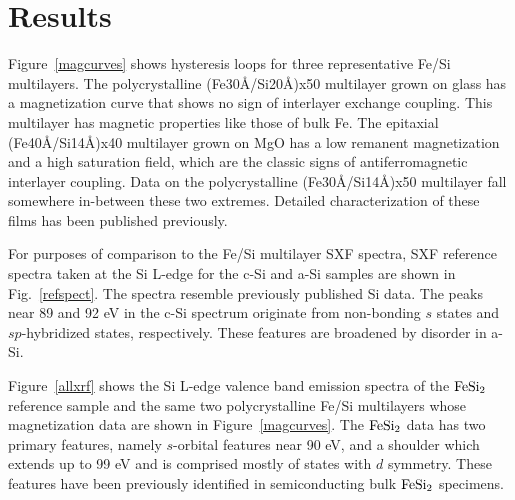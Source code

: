
\section{Results}

Figure~\ref{magcurves} shows hysteresis loops for three representative
Fe/Si multilayers.  The polycrystalline (Fe30\AA/Si20\AA)x50
multilayer grown on glass has a magnetization curve that shows no sign
of interlayer exchange coupling.  This multilayer has magnetic
properties like those of bulk Fe.  The epitaxial (Fe40\AA/Si14\AA)x40
multilayer grown on MgO has a low remanent magnetization and a high
saturation field, which are the classic signs of antiferromagnetic
interlayer coupling.  Data on the polycrystalline (Fe30\AA/Si14\AA)x50
multilayer fall somewhere in-between these two extremes.  Detailed
characterization of these films has been published
previously.\cite{fesiprb}

For purposes of comparison to the Fe/Si multilayer SXF spectra, SXF
reference spectra taken at the Si L-edge for the c-Si and a-Si samples
are shown in Fig.~\ref{refspect}.  The spectra resemble previously
published Si data.\cite{ederer,nilsson} The peaks near 89 and 92 eV in
the c-Si spectrum originate from non-bonding $s$ states and
$sp$-hybridized states, respectively.\cite{nilsson,jia} These features
are broadened by disorder in a-Si.

Figure~\ref{allxrf} shows the Si L-edge valence band emission spectra
of the $\rm FeSi_2$ reference sample and the same two polycrystalline
Fe/Si multilayers whose magnetization data are shown in
Figure~\ref{magcurves}.  The $\rm FeSi_2$ data has two primary
features, namely $s$-orbital features near 90 eV, and a shoulder which
extends up to 99 eV and is comprised mostly of states with $d$
symmetry.  These features have been previously identified in
semiconducting bulk $\rm FeSi_2$ specimens.\cite{jia}

